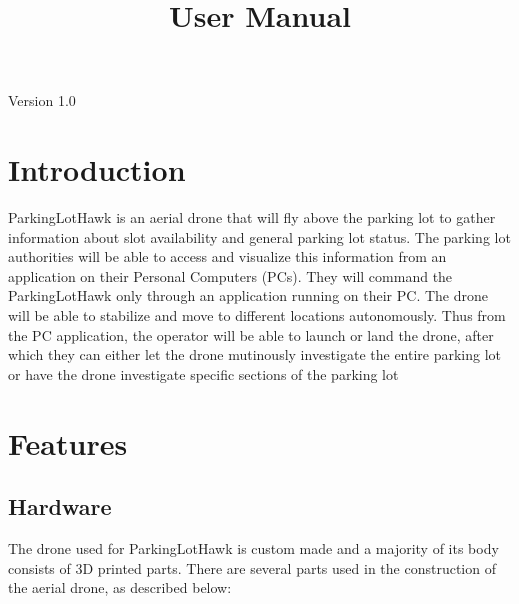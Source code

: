 \documentclass[12pt]{article}
\begin{document}
\title{User Manual}
\author{\authname}
\maketitle
\label{userManual}

\begin{center}
Version 1.0    
\end{center}

\newpage

\tableofcontents

\listoftables


\newpage

\section{Introduction}

ParkingLotHawk is an aerial drone that will fly above the parking lot to gather information about slot availability and general parking lot status. The parking lot authorities will be able to access and visualize this information from an application on their Personal Computers (PCs). They will command the ParkingLotHawk only through an application running on their PC. The drone will be able to stabilize and move to different locations autonomously. Thus from the PC application, the operator will be able to launch or land the drone, after which they can either let the drone mutinously investigate the entire parking lot or have the drone investigate specific sections of the parking lot

\section{Features}

\subsection{Hardware}

The drone used for ParkingLotHawk is custom made and a majority of its body consists of 3D printed parts. There are several parts used in the construction of the aerial drone, as described below:
\end{document}
